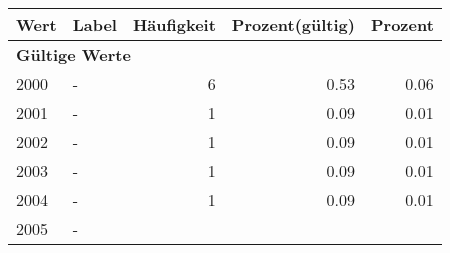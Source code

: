      \begin{longtable}{lXrrr}
     \toprule
     \textbf{Wert} & \textbf{Label} & \textbf{Häufigkeit} & \textbf{Prozent(gültig)} & \textbf{Prozent} \\
     \endhead
     \midrule
     \multicolumn{5}{l}{\textbf{Gültige Werte}}\\

     2000 &
     \multicolumn{1}{X}{ -  } &


       \num{6} &
       \num[round-mode=places,round-precision=2]{0.53} &
         \num[round-mode=places,round-precision=2]{0.06} \\

     2001 &
     \multicolumn{1}{X}{ -  } &


       \num{1} &
       \num[round-mode=places,round-precision=2]{0.09} &
         \num[round-mode=places,round-precision=2]{0.01} \\

     2002 &
     \multicolumn{1}{X}{ -  } &


       \num{1} &
       \num[round-mode=places,round-precision=2]{0.09} &
         \num[round-mode=places,round-precision=2]{0.01} \\

     2003 &
     \multicolumn{1}{X}{ -  } &


       \num{1} &
       \num[round-mode=places,round-precision=2]{0.09} &
         \num[round-mode=places,round-precision=2]{0.01} \\

     2004 &
     \multicolumn{1}{X}{ -  } &


       \num{1} &
       \num[round-mode=places,round-precision=2]{0.09} &
         \num[round-mode=places,round-precision=2]{0.01} \\

     2005 &
     \multicolumn{1}{X}{ -  } &



\end{longtable}

